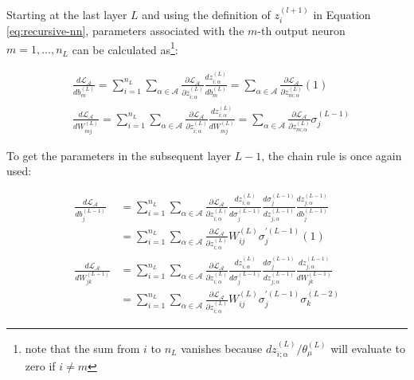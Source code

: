 \begin{enumerate}
     Starting at the last layer $L$ and using the definition of $z_i^{(l+1)}$ in Equation \ref{eq:recursive-nn}, parameters associated with the $m$-th output neuron $m = 1,...,n_L$ can be calculated as\footnote{note that the sum from $i$ to $n_L$ vanishes because $dz_{i;\alpha}^{(L)}/\theta_\mu^{(L)}$ will evaluate to zero if $i \neq m$}:

    \begin{equation}
        \begin{split}
        & \frac{d\mathcal{L}_\mathcal{A}}{d b_m^{(L)}} = \sum^{n_{L}}_{i=1} \sum_{\alpha\in\mathcal{A}} \frac{\partial\mathcal{L}_\mathcal{A}}{\partial z_{i;\alpha}^{(L)}} \frac{dz_{i;\alpha}^{(L)}}{db_m^{(L)}} = \sum_{\alpha\in\mathcal{A}} \frac{\partial \mathcal{L}_\mathcal{A}}{\partial z_{m;\alpha}^{(L)}} (1) \\
        & \frac{d\mathcal{L}_\mathcal{A}}{dW_{mj}^{(L)}} = \sum^{n_{L}}_{i=1} \sum_{\alpha\in\mathcal{A}} \frac{\partial\mathcal{L}_\mathcal{A}}{\partial z_{i;\alpha}^{(L)}} \frac{dz_{i;\alpha}^{(L)}}{dW_{mj}^{(L)}} = \sum_{\alpha\in\mathcal{A}} \frac{\partial\mathcal{L}_\mathcal{A}}{\partial z_{m;\alpha}^{(L)}} \sigma_j^{(L-1)}
        \end{split}
    \end{equation}

    To get the parameters in the subsequent layer $L-1$, the chain rule is once again used:

    \begin{equation}
        \begin{split}
        \frac{d\mathcal{L}_\mathcal{A}}{db_j^{(L-1)}} &= \sum^{n_{L}}_{i=1} \sum_{\alpha\in\mathcal{A}} \frac{\partial \mathcal{L}_\mathcal{A}}{\partial z_{i;\alpha}^{(L)}} \frac{dz_{i;\alpha}^{(L)}}{d\sigma_j^{(L-1)}} \frac{d\sigma_j^{(L-1)}}{dz_{j;\alpha}^{(L-1)}} \frac{dz_{j;\alpha}^{(L-1)}}{db_j^{(L-1)}} \\
        &= \sum^{n_{L}}_{i=1} \sum_{\alpha\in\mathcal{A}} \frac{\partial \mathcal{L}_\mathcal{A}}{\partial z_{i;\alpha}^{(L)}} W_{ij}^{(L)} \sigma_j^{\prime(L-1)} (1) \\
        \frac{d\mathcal{L}_\mathcal{A}}{dW_{jk}^{(L-1)}} &= \sum^{n_{L}}_{i=1} \sum_{\alpha\in\mathcal{A}} \frac{\partial \mathcal{L}_\mathcal{A}}{\partial z_{i;\alpha}^{(L)}} \frac{dz_{i;\alpha}^{(L)}}{d\sigma_j^{(L-1)}} \frac{d\sigma_j^{(L-1)}}{dz_{j;\alpha}^{(L-1)}} \frac{dz_{j;\alpha}^{(L-1)}}{dW_{jk}^{(L-1)}} \\
        &= \sum^{n_{L}}_{i=1} \sum_{\alpha\in\mathcal{A}} \frac{\partial \mathcal{L}_\mathcal{A}}{\partial z_{i;\alpha}^{(L)}} W_{ij}^{(L)} \sigma_j^{\prime(L-1)} \sigma_k^{(L-2)}
        \end{split}
    \end{equation}


\end{enumerate}
